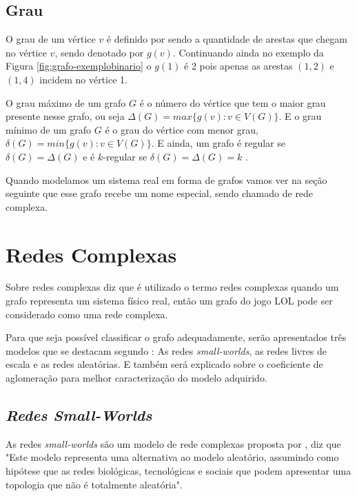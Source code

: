 \subsection{Grau}

O grau de um vértice \(v\) é definido por \citet{grafosucinto} sendo a quantidade de arestas que chegam no vértice \(v\), sendo denotado por \(g(v)\). Continuando ainda no exemplo da Figura \ref{fig:grafo-exemplobinario} o \(g(1)\) é 2 pois apenas as arestas \((1,2)\) e \((1,4)\) incidem no vértice 1.

O grau máximo de um grafo \(G\) é o número do vértice que tem o maior grau presente nesse grafo, ou seja \(\Delta(G) = max\{g(v) : v \in V(G)\}\). E o grau mínimo de um grafo \(G\) é o grau do vértice com menor grau, \(\delta(G) = min\{g(v) : v \in V(G)\}\). E ainda, um grafo é regular se \(\delta(G) = \Delta(G)\) e é \(k\)-regular se \(\delta(G) = \Delta(G) = k\) \cite{grafosucinto}.


Quando modelamos um sistema real em forma de grafos vamos ver na seção seguinte que esse grafo recebe um nome especial, sendo chamado de rede complexa.

\section{Redes Complexas}
\label{chap:redecomplexa}
Sobre redes complexas \citet{Viana2007} diz que é utilizado o termo redes complexas quando um grafo representa um sistema físico real, então um grafo do jogo LOL pode ser considerado como uma rede complexa.

Para que seja possível classificar o grafo adequadamente, serão apresentados três modelos que se destacam segundo \citet{Albert2002}: As redes \textit{small-worlds}, as redes livres de escala e as redes aleatórias. E também será explicado sobre o coeficiente de aglomeração para melhor caracterização do modelo adquirido.

\subsection{\textit{Redes Small-Worlds}}
 As redes \textit{small-worlds} são um modelo de rede complexas proposta por \citet{watts1998collective}, \citet{lopes2011redes} diz que "Este modelo representa uma alternativa ao modelo aleatório, assumindo como hipótese que as redes biológicas, tecnológicas e sociais que podem apresentar uma topologia que não é totalmente aleatória". 
 
